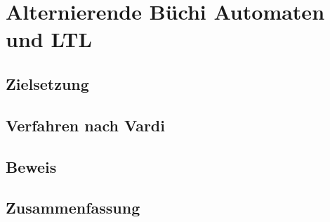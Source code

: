 \section{Alternierende Büchi Automaten und LTL}

\subsection{Zielsetzung}
\begin{frame}{\insertsubsection}
\end{frame}

\subsection{Verfahren nach Vardi}
\begin{frame}{\insertsubsection}
\end{frame}

\subsection{Beweis}
\begin{frame}{\insertsubsection}
\end{frame}

\subsection{Zusammenfassung}
\begin{frame}{\insertsubsection}
\end{frame}